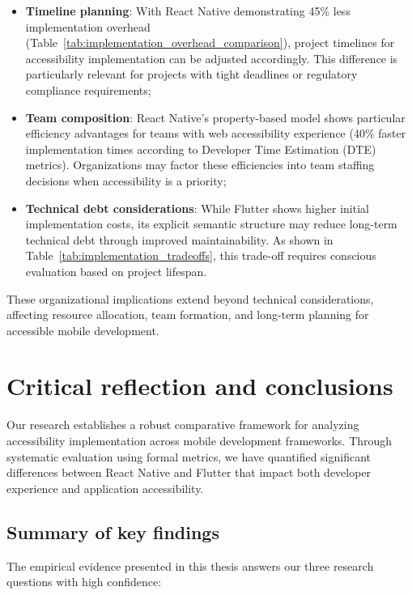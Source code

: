 \begin{itemize}
    \item \textbf{Timeline planning}: With React Native demonstrating 45\% less implementation overhead (Table~\ref{tab:implementation_overhead_comparison}), project timelines for accessibility implementation can be adjusted accordingly. This difference is particularly relevant for projects with tight deadlines or regulatory compliance requirements;

    \item \textbf{Team composition}: React Native's property-based model shows particular efficiency advantages for teams with web accessibility experience (40\% faster implementation times according to Developer Time Estimation (DTE) metrics). Organizations may factor these efficiencies into team staffing decisions when accessibility is a priority;

    \item \textbf{Technical debt considerations}: While Flutter shows higher initial implementation costs, its explicit semantic structure may reduce long-term technical debt through improved maintainability. As shown in Table~\ref{tab:implementation_tradeoffs}, this trade-off requires conscious evaluation based on project lifespan.
\end{itemize}

These organizational implications extend beyond technical considerations, affecting resource allocation, team formation, and long-term planning for accessible mobile development.

\section{Critical reflection and conclusions}
\label{sec:conclusion}

Our research establishes a robust comparative framework for analyzing accessibility implementation across mobile development frameworks. Through systematic evaluation using formal metrics, we have quantified significant differences between React Native and Flutter that impact both developer experience and application accessibility.

\subsection{Summary of key findings}
\label{subsec:conclusion-findings}

The empirical evidence presented in this thesis answers our three research questions with high confidence:

